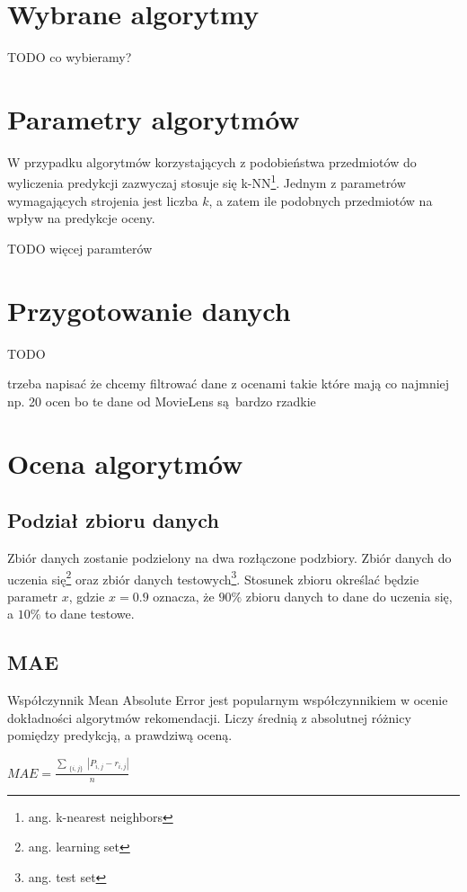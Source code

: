 \documentclass[12pt, a4paper]{article}
\begin{document}
\section{Wybrane algorytmy}
TODO co wybieramy?

\section{Parametry algorytmów}
W przypadku algorytmów korzystających z podobieństwa przedmiotów do wyliczenia predykcji zazwyczaj stosuje się k-NN\footnote{ang. k-nearest neighbors}. Jednym z parametrów wymagających strojenia jest liczba $k$, a zatem ile podobnych przedmiotów na wpływ na predykcje oceny.

TODO więcej paramterów

\section{Przygotowanie danych}
TODO

trzeba napisać że chcemy filtrować dane z ocenami takie które mają co najmniej np. 20 ocen bo te dane od MovieLens są bardzo rzadkie

\section{Ocena algorytmów}

\subsection{Podział zbioru danych}
Zbiór danych zostanie podzielony na dwa rozłączone podzbiory. Zbiór danych do uczenia się\footnote{ang. learning set} oraz zbiór danych testowych\footnote{ang. test set}. Stosunek zbioru określać będzie parametr $x$, gdzie $x = 0.9$ oznacza, że $90\%$ zbioru danych to dane do uczenia się, a $10\%$ to dane testowe.

\subsection{MAE}
Współczynnik Mean Absolute Error jest popularnym współczynnikiem w ocenie dokładności algorytmów rekomendacji. Liczy średnią z absolutnej różnicy pomiędzy predykcją, a prawdziwą oceną.

\begin{math}
MAE = \frac{
	\sum_{\substack{
   \{i, j\}
  }}
  |P_{i,j} - r_{i,j}|
}{n}
\end{math}
\end{document}
